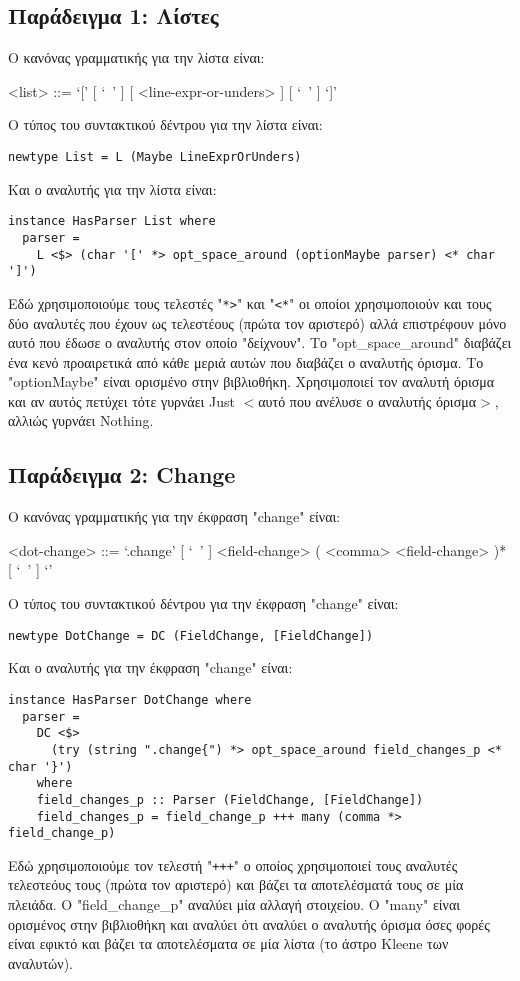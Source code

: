 \documentclass[diploma]{softlab-thesis}
\begin{document}
\newpage

\subsection{Παράδειγμα 1: Λίστες}

Ο κανόνας γραμματικής για την λίστα είναι:
\begin{grammar}
<list> ::= `[' [ `\ ' ] [ <line-expr-or-unders> ] [ `\ ' ] `]' \\
\end{grammar}
Ο τύπος του συντακτικού δέντρου για την λίστα είναι:
\begin{verbatim}
newtype List = L (Maybe LineExprOrUnders)

\end{verbatim}
Και ο αναλυτής για την λίστα είναι:
\begin{verbatim}
instance HasParser List where
  parser =
    L <$> (char '[' *> opt_space_around (optionMaybe parser) <* char ']')

\end{verbatim}
Εδώ χρησιμοποιούμε τους τελεστές "\verb|*>|" και "\verb|<*|" οι οποίοι
χρησιμοποιούν και τους δύο αναλυτές που έχουν ως τελεστέους (πρώτα τον
αριστερό) αλλά επιστρέφουν μόνο αυτό που έδωσε ο αναλυτής στον οποίο
"δείχνουν". Το "opt_space_around" διαβάζει ένα κενό προαιρετικά
από κάθε μεριά αυτών που διαβάζει ο αναλυτής όρισμα. Το "optionMaybe"
είναι ορισμένο στην βιβλιοθήκη. Χρησιμοποιεί τον αναλυτή όρισμα και αν αυτός
πετύχει τότε γυρνάει Just $<$αυτό που ανέλυσε ο αναλυτής όρισμα$>$, αλλιώς
γυρνάει Nothing.

\subsection{Παράδειγμα 2: Change}

Ο κανόνας γραμματικής για την έκφραση "change" είναι:
\begin{grammar}
<dot-change> ::=
`.change{' [ `\ ' ] <field-change> ( <comma> <field-change> )* [ `\ ' ] `}'
\\
\end{grammar}
Ο τύπος του συντακτικού δέντρου για την έκφραση "change" είναι:
\begin{verbatim}
newtype DotChange = DC (FieldChange, [FieldChange])

\end{verbatim}
Και ο αναλυτής για την έκφραση "change" είναι:
\begin{verbatim}
instance HasParser DotChange where
  parser =
    DC <$>
      (try (string ".change{") *> opt_space_around field_changes_p <* char '}')
    where
    field_changes_p :: Parser (FieldChange, [FieldChange])
    field_changes_p = field_change_p +++ many (comma *> field_change_p)

\end{verbatim}
Εδώ χρησιμοποιούμε τον τελεστή "\verb|+++|" ο οποίος χρησιμοποιεί τους αναλυτές
τελεστεόυς τους (πρώτα τον αριστερό) και βάζει τα αποτελέσματά τους σε μία
πλειάδα. O "field_change_p" αναλύει μία αλλαγή στοιχείου. Ο "many" είναι
ορισμένος στην βιβλιοθήκη και αναλύει ότι αναλύει ο αναλυτής όρισμα όσες
φορές είναι εφικτό και βάζει τα αποτελέσματα σε μία λίστα
(το άστρο Kleene των αναλυτών).
\end{document}
